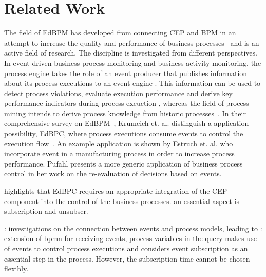 \chapter{Related Work}\label{ch:relatedwork}


The field of \acf{EdBPM} has developed from connecting \ac{CEP} and \ac{BPM} in an attempt to increase the quality and performance of business processes~\cite{luckham2008power} and is an active field of research.
The discipline is investigated from different perspectives.
In event-driven business process monitoring and business activity monitoring, the process engine takes the role of an event producer that publishes information about its process executions to an event engine \cite{baumgrass2014bpmn, herzberg2013improving, bulow2013monitoring}. 
This information can be used to detect process violations, evaluate execution performance and derive key performance indicators during process exeuction \cite{janiesch2011blueprint, janiesch:poc-eventdriven-bam}, whereas the field of process mining intends to derive process knowledge from historic processes~\cite{tiwari2008review}.
In their comprehensive survey on \ac{EdBPM}~\cite{Krumeich2014EventDrivenBP}, Krumeich et. al. distinguish a application possibility, \acf{EdBPC}, where process executions consume events to control the execution flow~\cite{Cabanillas2014, Baumgrass2016}.
An example application is shown by Estruch et. al. \cite{estruch2012event} who incorporate event in a manufacturing process in order to increase process performance.
Pufahl \cite{Pufahl2017} presents a more generic application of business process control in her work on the re-evaluation of decisions based on events.

\cite{chandy2010event} highlights that EdBPC requires an appropriate integration of the CEP component into the control of the business processes.
an essential aspect is subscription and unsubscr. \cite{luckham2008power}

\cite{Cabanillas2014}: investigations on the connection between events and process models, leading to \cite{Baumgrass2016}: extension of bpmn for receiving events, process variables in the query
\cite{Pufahl2017} makes use of events to control process executions and considers event subscription as an essential step in the process. However, the subscription time cannot be chosen flexibly.

